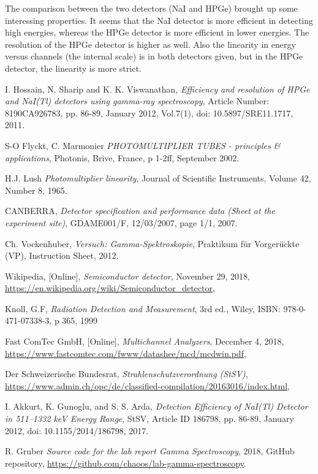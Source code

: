 \documentclass[a4paper]{article}
\begin{document}
The comparison between the two detectors (NaI and HPGe) brought up some interessing properties. It seems that the NaI detector is more efficient in detecting high energies, whereas the HPGe detector is more efficient in lower energies. The resolution of the HPGe detector is higher as well. Also the linearity in energy versus channels (the internal scale) is in both detectors given, but in the HPGe detector, the linearity is more strict.

\begin{thebibliography}{9}

  I. Hossain, N. Sharip and K. K. Viswanathan,
  \textit{Efficiency and resolution of HPGe and NaI(Tl) detectors using gamma-ray spectroscopy},
  Article Number: 8190CA926783,
  pp. 86-89, January 2012,
  Vol.7(1),
  doi: 10.5897/SRE11.1717,
  2011.

  S-O Flyckt, C. Marmonier
  \textit{PHOTOMULTIPLIER TUBES - principles \& applications},
  Photonis, Brive, France,
  p 1-2ff,
  September 2002.

  H.J. Lush
  \textit{Photomultiplier linearity},
  Journal of Scientific Instruments,
  Volume 42,
  Number 8,
  1965.

  CANBERRA,
  \textit{Detector specification and performance data (Sheet at the experiment site)},
  GDAME001/F,
  12/03/2007,
  page 1/1,
  2007.

  Ch. Vockenhuber,
  \textit{Versuch: Gamma-Spektroskopie},
  Praktikum für Vorgerückte (VP),
  Instruction Sheet,
  2012.

  Wikipedia, [Online],
  \textit{Semiconductor detector},
  November 29, 2018,
  \url{https://en.wikipedia.org/wiki/Semiconductor_detector},

  Knoll, G.F,
  \textit{Radiation Detection and Measurement},
  3rd ed.,
  Wiley,
  ISBN: 978-0-471-07338-3,
  p 365,
  1999

  Fast ComTec GmbH, [Online],
  \textit{Multichannel Analyzers},
  December 4, 2018,
  \url{https://www.fastcomtec.com/fwww/datashee/mcd/mcdwin.pdf},

  Der Schweizerische Bundesrat,
  \textit{Strahlenschutzverordnung (StSV)},
  \url{https://www.admin.ch/opc/de/classified-compilation/20163016/index.html},

  I. Akkurt, K. Gunoglu, and S. S. Arda,
  \textit{Detection Efficiency of NaI(Tl) Detector in 511–1332 keV Energy Range},
  StSV,
  Article ID 186798,
  pp. 86-89, January 2012,
  doi: 10.1155/2014/186798,
  2017.

  R. Gruber
  \textit{Source code for the lab report Gamma Spectroscopy},
  2018,
  GitHub repository,
  \url{https://github.com/chaoos/lab-gamma-spectroscopy}.
\end{thebibliography}
\end{document}
